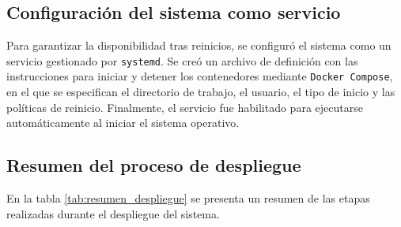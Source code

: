 \subsection{Configuración del sistema como servicio}

Para garantizar la disponibilidad tras reinicios, se configuró el sistema como
un servicio gestionado por \texttt{systemd}. Se creó un archivo de definición
con las instrucciones para iniciar y detener los contenedores mediante
\texttt{Docker Compose}, en el que se especifican el directorio de trabajo, el
usuario, el tipo de inicio y las políticas de reinicio. Finalmente, el servicio
fue habilitado para ejecutarse automáticamente al iniciar el sistema operativo.

\subsection{Resumen del proceso de despliegue}

En la tabla \ref{tab:resumen_despliegue} se presenta un resumen de las etapas
realizadas durante el despliegue del sistema.

